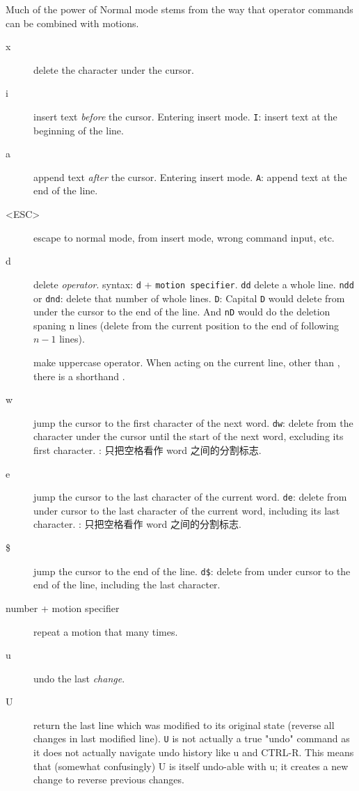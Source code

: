 Much of the power of Normal mode stems from the way that operator commands can be combined with motions.

\begin{description}
  \item[x] delete the character under the cursor.
  \item[i] insert text \emph{before} the cursor. Entering insert mode. \texttt{I}: insert text at the beginning of the line.
  \item[a] append text \emph{after} the cursor. Entering insert mode. \texttt{A}: append text at the end of the line.
  \item[<ESC>] escape to normal mode, from insert mode, wrong command input, etc.
  \item[d] delete \emph{operator}. syntax: \texttt{d} + \texttt{motion specifier}. \texttt{dd} delete a whole line. \texttt{ndd} or \texttt{dnd}: delete that number of whole lines. \verb|D|: Capital \verb|D| would delete from under the cursor to the end of the line. And \verb|nD| would do the deletion spaning n lines (delete from the current position to the end of following $n-1$ lines).
  \item[] make uppercase operator. When acting on the current line, other than , there is a shorthand .
  \item[w] jump the cursor to the first character of the next word. \texttt{dw}: delete from the character under the cursor until the start of the next word, excluding its first character. : 只把空格看作 word 之间的分割标志.
  \item[e] jump the cursor to the last character of the current word. \texttt{de}: delete from under cursor to the last character of the current word, including its last character. : 只把空格看作 word 之间的分割标志.
  \item[\$] jump the cursor to the end of the line. \texttt{d\$}: delete from under cursor to the end of the line, including the last character.
\item[number + motion specifier] repeat a motion that many times. 
\item[u] undo the last \syntax{[count]} \emph{change}.
\item[U] return the last line which was modified to its original state (reverse all changes in last modified line). \texttt{U} is not actually a true "undo" command as it does not actually navigate undo history like u and CTRL-R. This means that (somewhat confusingly) U is itself undo-able with u; it creates a new change to reverse previous changes.

\end{description}
